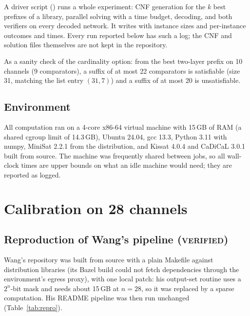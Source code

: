 \documentclass[11pt,a4paper]{article}
\theoremstyle{plain}
\theoremstyle{definition}
\theoremstyle{remark}
\newcommand{\VER}{\textsc{verified}}
\begin{document}
A driver script () runs a whole experiment: CNF generation for the $k$ best prefixes of a library, parallel solving with a time budget, decoding, and both verifiers on every decoded network. It writes  with instance sizes and per-instance outcomes and times. Every run reported below has such a log; the CNF and solution files themselves are not kept in the repository.

As a sanity check of the cardinality option: from the best two-layer prefix on 10 channels (9 comparators), a suffix of at most 22 comparators is satisfiable (size 31, matching the list entry $(31,7)$) and a suffix of at most 20 is unsatisfiable.

\subsection{Environment}\label{sec:env}

All computation ran on a 4-core x86-64 virtual machine with 15\,GB of RAM (a shared cgroup limit of 14.3\,GB), Ubuntu 24.04, gcc 13.3, Python 3.11 with numpy, MiniSat 2.2.1 \cite{MiniSat} from the distribution, and Kissat 4.0.4 and CaDiCaL 3.0.1 built from source. The machine was frequently shared between jobs, so all wall-clock times are upper bounds on what an idle machine would need; they are reported as logged.

\section{Calibration on 28 channels}\label{sec:calib}

\subsection{Reproduction of Wang's pipeline (\VER)}\label{sec:repro}

Wang's repository was built from source with a plain Makefile against distribution libraries (its Bazel build could not fetch dependencies through the environment's egress proxy), with one local patch: his output-set routine uses a $2^n$-bit mask and needs about 15\,GB at $n=28$, so it was replaced by a sparse computation. His README pipeline was then run unchanged (Table~\ref{tab:repro}).
\end{document}
